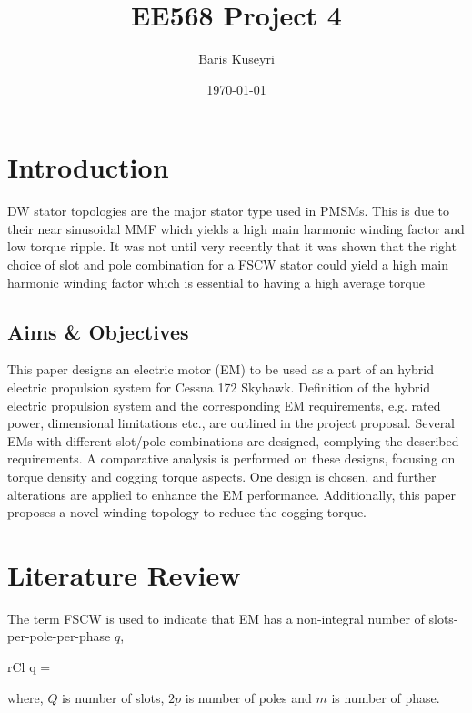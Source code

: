 \documentclass [a4 paper, 11pt, titlepage] {article}
\begin{document}
	\title{EE568 Project 4}
	\author{Baris Kuseyri}
	\date{\today}
	\maketitle
	
	\tableofcontents
	\newpage
	
	\section{Introduction}

	DW stator topologies are the major stator type used in PMSMs. This is due to their near sinusoidal MMF which yields a high main harmonic winding factor and low torque ripple. It was not until very recently that it was shown that the right choice of slot and pole combination for a FSCW stator could yield a high main harmonic winding factor which is essential to having a high average torque \cite{farshadnia_advanced_2018}









	\subsection{Aims \& Objectives}
	This paper designs an electric motor (EM) to be used as a part of an hybrid electric propulsion system for Cessna 172 Skyhawk. Definition of the hybrid electric propulsion system and the corresponding EM requirements, e.g. rated power, dimensional limitations etc., are outlined in the project proposal. Several EMs with different slot/pole combinations are designed, complying the described requirements. A comparative analysis is performed on these designs, focusing on torque density and cogging torque aspects. One design is chosen, and further alterations are applied to enhance the EM performance. Additionally, this paper proposes a novel winding topology to reduce the cogging torque.


	\section{Literature Review}
	The term FSCW is used to indicate that EM has a non-integral number of slots-per-pole-per-phase $q$,
	\begin{IEEEeqnarray*}{rCl}
		q = 
	\end{IEEEeqnarray*}
	where, $Q$ is number of slots, $2p$ is number of poles and $m$ is number of phase.
	
\end{document}
